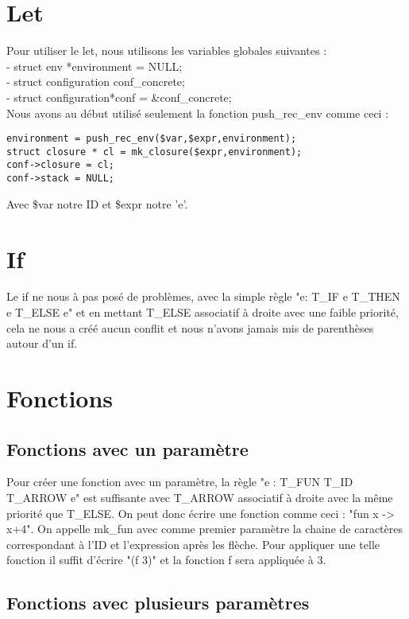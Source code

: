 \documentclass{report}
\begin{document}
\section{Let}

Pour utiliser le let, nous utilisons les variables globales suivantes :\\
- struct env *environment = NULL;\\
- struct configuration conf\_concrete;\\
- struct configuration*conf = \&conf\_concrete;\\
Nous avons au début utilisé seulement la fonction push\_rec\_env comme ceci :
\begin{verbatim}
environment = push_rec_env($var,$expr,environment);
struct closure * cl = mk_closure($expr,environment);
conf->closure = cl;
conf->stack = NULL;
\end{verbatim}
Avec \$var notre ID et \$expr notre 'e'.


\section{If}

Le if ne nous à pas posé de problèmes, avec la simple règle "e: T\_IF e T\_THEN e T\_ELSE e" et en mettant T\_ELSE associatif à droite avec une faible priorité, cela ne nous a créé aucun conflit et nous n'avons jamais mis de parenthèses autour d'un if.

\section{Fonctions}
\subsection{Fonctions avec un paramètre}

Pour créer une fonction avec un paramètre, la règle "e : T\_FUN T\_ID T\_ARROW e" est suffisante avec T\_ARROW associatif à droite avec la même priorité que T\_ELSE. On peut donc écrire une fonction comme ceci : "fun x -> x+4".
On appelle mk\_fun avec comme premier paramètre la chaine de caractères correspondant à l'ID et l'expression après les flèche.
Pour appliquer une telle fonction il suffit d'écrire "(f 3)" et la fonction f sera appliquée à 3.

\subsection{Fonctions avec plusieurs paramètres}
\end{document}
